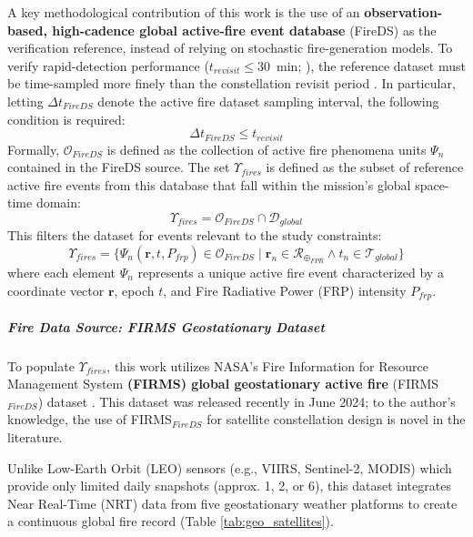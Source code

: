A key methodological contribution of this work is the use of an \textbf{observation-based, high-cadence global active-fire event database} (FireDS) as the verification reference, instead of relying on stochastic fire-generation models. To verify rapid-detection performance ($t_{revisit} \leq 30$~min; ), the reference dataset must be time-sampled more finely than the constellation revisit period . In particular, letting $\Delta t_{FireDS}$ denote the active fire dataset sampling interval, the following condition is required:
\begin{equation}
    \Delta t_{FireDS} \leq t_{revisit}
\end{equation}
Formally, $\mathcal{O}_{FireDS}$ is defined as the collection of active fire phenomena units $\Psi_n$ contained in the FireDS source. The set $\Upsilon_{fires}$ is defined as the subset of reference active fire events from this database that fall within the mission's global space-time domain:
\begin{equation}
    \Upsilon_{fires} = \mathcal{O}_{FireDS} \cap \mathcal{D}_{global}
\end{equation}
This filters the dataset for events relevant to the study constraints:
\begin{equation}
    \Upsilon_{fires} = \{ \Psi_n(\mathbf{r}, t, P_{frp}) \in \mathcal{O}_{FireDS} \mid \mathbf{r}_n \in \mathcal{R}_{\oplus_{FPR}} \wedge t_n \in \mathcal{T}_{global} \}
\end{equation}
where each element $\Psi_n$ represents a unique active fire event characterized by a coordinate vector $\mathbf{r}$, epoch $t$, and Fire Radiative Power (FRP) intensity $P_{frp}$.

\subparagraph{Fire Data Source: FIRMS Geostationary Dataset} \hspace{0pt}
\label{sec:firms_dataset}
To populate $\Upsilon_{fires}$, this work utilizes NASA's Fire Information for Resource Management System \textbf{(FIRMS) global geostationary active fire} (FIRMS$_{FireDS}$) dataset \cite{davies_geostationary_2024}. This dataset was released recently in June 2024; to the author's knowledge, the use of FIRMS$_{FireDS}$ for satellite constellation design is novel in the literature. 

Unlike Low-Earth Orbit (LEO) sensors (e.g., VIIRS, Sentinel-2, MODIS) which provide only limited daily snapshots (approx. 1, 2, or 6), this dataset integrates Near Real-Time (NRT) data from five geostationary weather platforms to create a continuous global fire record (Table \ref{tab:geo_satellites}). 

